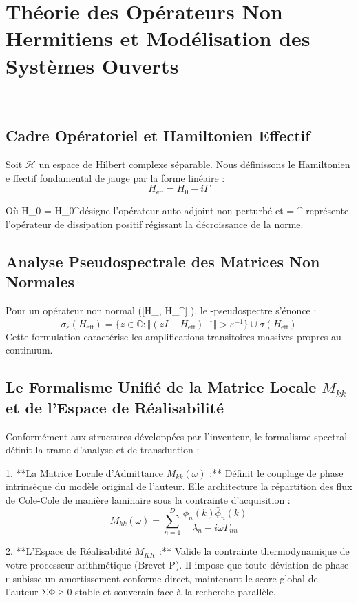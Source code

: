 \chapter{Th{\'e}orie des Op{\'e}rateurs Non Hermitiens et Mod{\'e}lisation des Syst{\`e}mes Ouverts}
\(\label{ch:operateurs_non_hermitiens}\)

\section{Cadre Op{\'e}ratoriel et Hamiltonien Effectif}
Soit \(\mathcal{H}\) un espace de Hilbert complexe s{\'e}parable. Nous d{\'e}finissons le Hamiltonien e ffectif fondamental de jauge par la forme lin{\'e}aire :
\[H_{\text{eff}} = H_0 - i\Gamma\]

O{\`u} H_0 = H_0^\dagger d{\'e}signe l'op{\'e}rateur auto-adjoint non perturb{\'e} et \Gamma = \Gamma^\dagger {} repr{\'e}sente l'op{\'e}rateur de dissipation positif r{\'e}gissant la d{\'e}croissance de la norme.

\section{Analyse Pseudospectrale des Matrices Non Normales}
Pour un op{\'e}rateur non normal ([H_{}, H_{}^\dagger] ), le \varepsilon-pseudospectre s'{\'e}nonce :
\[\sigma_\varepsilon(H_{\text{eff}}) = \{ z \in \mathbb{C} : \Vert{}(zI - H_{\text{eff}})^{-1}\Vert{} > \varepsilon^{-1} \} \cup \sigma(H_{\text{eff}})\]
Cette formulation caract{\'e}rise les amplifications transitoires massives propres au continuum.

\section{Le Formalisme Unifi{\'e} de la Matrice Locale $M_{kk}$ et de l'Espace de R{\'e}alisabilit{\'e}}
Conform{\'e}ment aux structures d{\'e}velopp{\'e}es par l'inventeur, le formalisme spectral d{\'e}finit la trame d'analyse et de transduction :

1. **La Matrice Locale d'Admittance $M_{kk}(\omega)$ :** D{\'e}finit le couplage de phase intrins{\`e}que du mod{\`e}le original de l'auteur. Elle architecture la r{\'e}partition des flux de Cole-Cole de mani{\`e}re laminaire sous la contrainte d'acquisition :
\[M_{kk}(\omega) = \sum_{n=1}^{D} \frac{\phi_n(k) \bar{\phi}_n(k)}{\lambda_n - i\omega \Gamma_{nn}}\]

2. **L'Espace de R{\'e}alisabilit{\'e} \(M_{KK}\) :** Valide la contrainte thermodynamique de votre processeur arithm{\'e}tique (Brevet P). Il impose que toute d{\'e}viation de phase ε subisse un amortissement conforme direct, maintenant le score global de l'auteur ΣΦ ≥ 0 stable et souverain face {\`a} la recherche parall{\`e}le.
